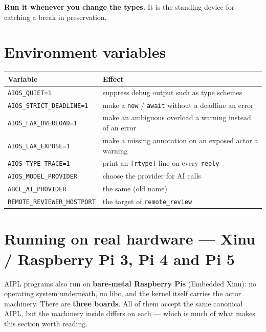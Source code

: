 \documentclass[11pt,a4paper]{article}
\begin{document}
\textbf{Run it whenever you change the types.} It is the standing device for
catching a break in preservation.

\section{Environment variables}

\begin{center}
\begin{tabular}{@{}ll@{}}
\toprule
Variable & Effect \\
\midrule
\texttt{AIOS\_QUIET=1}            & suppress debug output such as type schemes \\
\texttt{AIOS\_STRICT\_DEADLINE=1} & make a \texttt{now} / \texttt{await} without a deadline an error \\
\texttt{AIOS\_LAX\_OVERLOAD=1}    & make an ambiguous overload a warning instead of an error \\
\texttt{AIOS\_LAX\_EXPOSE=1}      & make a missing annotation on an exposed actor a warning \\
\texttt{AIOS\_TYPE\_TRACE=1}      & print an \texttt{[rtype]} line on every \texttt{reply} \\
\texttt{AIOS\_MODEL\_PROVIDER}    & choose the provider for AI calls \\
\texttt{ABCL\_AI\_PROVIDER}       & the same (old name) \\
\texttt{REMOTE\_REVIEWER\_HOSTPORT} & the target of \texttt{remote\_review} \\
\bottomrule
\end{tabular}
\end{center}

\section{Running on real hardware --- Xinu / Raspberry Pi 3, Pi 4 and Pi 5}
\label{sec:xinu}

AIPL programs also run on \textbf{bare-metal Raspberry Pis} (Embedded Xinu):
no operating system underneath, no libc, and the kernel itself carries the
actor machinery. There are \textbf{three boards}. All of them accept the same
canonical AIPL, but the machinery inside differs on each --- which is much of
what makes this section worth reading.
\end{document}
